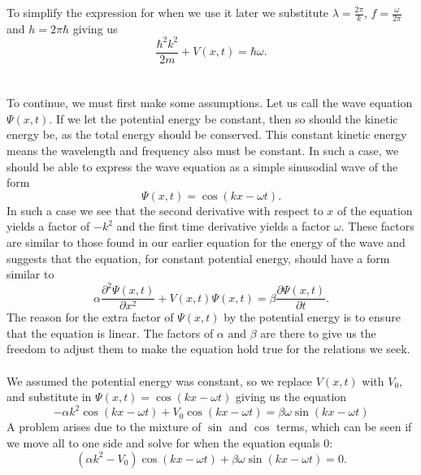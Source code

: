     To simplify the expression for when we use it later we substitute $\lambda=\frac{2\pi}{k}$, $f=\frac{\omega}{2\pi}$ and $h=2\pi\hbar$ giving us \begin{equation}
        \frac{\hbar^2 k^2}{2m}+V(x,t)=\hbar\omega.
        \label{eq:energy-from-k-and-o}
    \end{equation} \\ \\
    To continue, we must first make some assumptions. Let us call the wave equation $\Psi(x,t)$. If we let the potential energy be constant, then so should the kinetic energy be, as the total energy should be conserved. This constant kinetic energy means the wavelength and frequency also must be constant. In such a case, we should be able to express the wave equation as a simple sinusodial wave of the form \begin{equation}
        \Psi(x,t)=\cos(kx-\omega t).
    \end{equation}
    In such a case we see that the second derivative with respect to $x$ of the equation yields a factor of $-k^2$ and the first time derivative yields a factor $\omega$. These factors are similar to those found in our earlier equation for the energy of the wave and suggests that the equation, for constant potential energy, should have a form similar to \begin{equation}
        \alpha \frac{\partial^2\Psi(x,t)}{\partial x^2} + V(x,t)\Psi(x,t)=\beta\frac{\partial\Psi(x,t)}{\partial t}.\label{eq:we-with-unkowns}
    \end{equation}
    The reason for the extra factor of $\Psi(x,t)$ by the potential energy is to ensure that the equation is linear. The factors of $\alpha$ and $\beta$ are there to give us the freedom to adjust them to make the equation hold true for the relations we seek. \\ \\
    We assumed the potential energy was constant, so we replace $V(x,t)$ with $V_0$, and substitute in $\Psi(x,t)=\cos(kx-\omega t)$ giving us the equation \begin{equation}
        -\alpha k^2\cos(kx-\omega t)+V_0\cos(kx-\omega t)=\beta \omega \sin(kx-\omega t) 
    \end{equation}
    A problem arises due to the mixture of $\sin$ and $\cos$ terms, which can be seen if we move all to one side and solve for when the equation equals 0: \begin{equation}
        (\alpha k^2-V_0)\cos(kx-\omega t) + \beta\omega\sin(kx-\omega t)=0.
    \end{equation}
